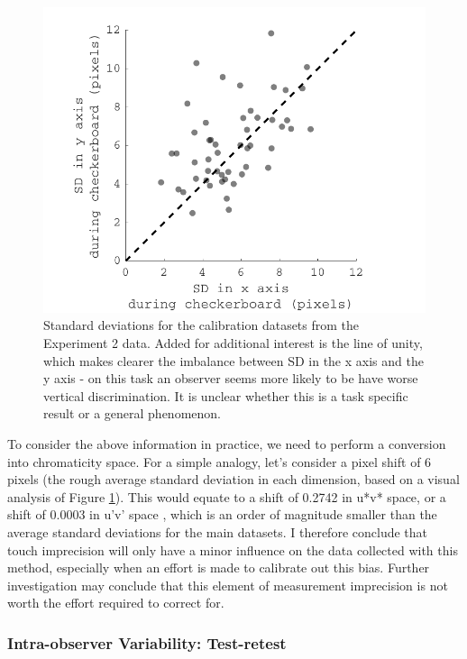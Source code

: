 \begin{figure}[hbtp]
\includegraphics[max width=\textwidth]{figs/tablet/BMtouch.pdf} 
\caption{Standard deviations for the calibration datasets from the Experiment 2 data. Added for additional interest is the line of unity, which makes clearer the imbalance between SD in the x axis and the y axis - on this task an observer seems more likely to be have worse vertical discrimination. It is unclear whether this is a task specific result or a general phenomenon.}
\label{fig:BMtouch}
\end{figure}

To consider the above information in practice, we need to perform a conversion into chromaticity space. For a simple analogy, let's consider a pixel shift of 6 pixels (the rough average standard deviation in each dimension, based on a visual analysis of Figure \ref{fig:BMtouch}). This would equate to a shift of 0.2742 in u*v* space, or a shift of 0.0003 in u'v' space %
, which is an order of magnitude smaller than the average standard deviations for the main datasets. I therefore conclude that touch imprecision will only have a minor influence on the data collected with this method, especially when an effort is made to calibrate out this bias. Further investigation may conclude that this element of measurement imprecision is not worth the effort required to correct for.

\subsubsection{Intra-observer Variability: Test-retest}

